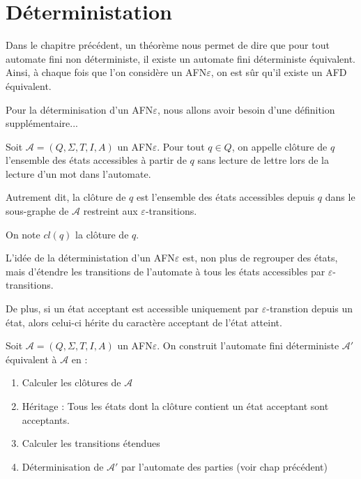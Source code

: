 
\section{Déterministation}

Dans le chapitre précédent, un théorème nous permet de dire que pour tout automate fini non déterministe, 
il existe un automate fini déterministe équivalent. Ainsi, à chaque fois que l'on considère un AFN$\varepsilon$, 
on est sûr qu'il existe un AFD équivalent. 

\vspace{0.3cm}

Pour la déterminisation d'un AFN$\varepsilon$, nous allons avoir besoin d'une définition supplémentaire... 

\begin{definition}[Clôture]
    Soit $\mathcal{A} = (Q,\Sigma, T, I, A)$ un AFN$\varepsilon$. 
    Pour tout $q \in Q$, on appelle clôture de $q$ l'ensemble des états accessibles à partir de $q$ sans lecture de 
    lettre lors de la lecture d'un mot dans l'automate. 

    Autrement dit, la clôture de $q$ est l'ensemble des états accessibles depuis $q$ dans le sous-graphe de $ \mathcal{A}$
    restreint aux $\varepsilon$-transitions. 
    
    On note $cl(q)$ la clôture de $q$. 
\end{definition}


L'idée de la déterministation d'un AFN$\varepsilon$ est, non plus de regrouper des états, mais d'étendre les transitions 
de l'automate à tous les états accessibles par $\varepsilon$-transitions. 

De plus, si un état acceptant est accessible uniquement par $\varepsilon$-transtion depuis un état, alors celui-ci 
hérite du caractère acceptant de l'état atteint. 

\begin{proposition}
    Soit $\mathcal{A} = (Q,\Sigma, T, I, A)$ un AFN$\varepsilon$. On construit l'automate fini déterministe $ \mathcal{A}'$ 
    équivalent à $ \mathcal{A}$ en :
    \begin{enumerate}
        \item Calculer les clôtures de $ \mathcal{A}$ 
        \item Héritage : Tous les états dont la clôture contient un état acceptant sont acceptants. 
        \item Calculer les transitions étendues 
        \item Déterminisation de $ \mathcal{A'}$ par l'automate des parties (voir chap précédent)
    \end{enumerate}
\end{proposition}

